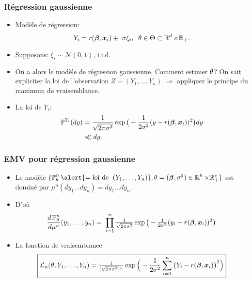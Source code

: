 \begin{frame}
\frametitle{Régression gaussienne}


\begin{itemize}
\item  Modèle de régression:
$$Y_i =
r({\boldsymbol{\beta}},\operatorname{\boldsymbol{x}}_i)+\ \sigma \xi_i,\;\;\theta \in \Theta\subset  \operatorname{{\mathbb R}}^d \times \mathbb{R}_+.$$
\item  Supposons: $\xi_i \sim {\mathcal N}(0,1)$, i.i.d.
\item On a alors le modèle de \alert{régression gaussienne}.
Comment estimer $\theta$?  \alert{On sait expliciter la loi
de l'observation} $Z=(Y_1,\dots,Y_n)$ $\Longrightarrow$ appliquer le
principe du maximum de vraisemblance.

\item La loi de $Y_i$:
\begin{align*}
\operatorname{{\mathbb P}}^{Y_i}(dy) & = \frac{1}{\sqrt{2\pi \sigma^2}}\exp\big
(-\frac{1}{2\sigma^2}(y-r({\boldsymbol{\beta}},\operatorname{\boldsymbol{x}}_i))^2\big)dy \\
& \ll dy.
\end{align*}

\end{itemize}
\end{frame}

\begin{frame}
\frametitle{EMV pour régression gaussienne}
\begin{itemize}
\item  Le modèle $\{\PP_\truetheta^n \alert{ = \text{loi de }\;(Y_1,\ldots, Y_n)},\truetheta = (\truebeta,\sigma^2) \in \R^k \times \rset_+^* \}$ est \alert{dominé} par
$\mu^n(dy_1\ldots dy_n) = dy_1\ldots dy_n.$
\item D'où
\[
 \frac{d\operatorname{{\mathbb P}}_\theta^n}{d\mu^n}(y_1,\ldots, y_n)
  =\; \prod_{i=1}^n \tfrac{1}{\sqrt{2\pi \sigma^2}}\exp
  \big(-\tfrac{1}{2\sigma^2}(y_i-r({\boldsymbol{\beta}},\operatorname{\boldsymbol{x}}_i))^2\big)
\]
\item La fonction de vraisemblance
$$\boxed{{\mathcal L}_n(\theta, Y_1,\ldots, Y_n)
= \tfrac{1}{(\sqrt{2\pi \sigma^2})^{n}} \exp\Big(-\frac{1}{2\sigma^2}\sum_{i = 1}^n\big(Y_i-
r({\boldsymbol{\beta}},\operatorname{\boldsymbol{x}}_i)\big)^2\Big)}$$
\end{itemize}
\end{frame}

